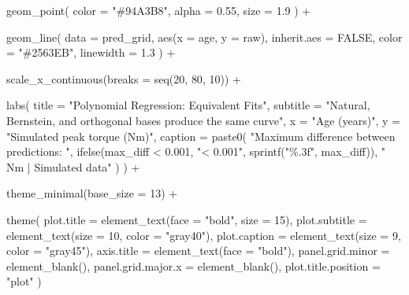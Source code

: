 \documentclass[
  letterpaper,
  DIV=11,
  numbers=noendperiod]{scrreprt}
\newenvironment{Shaded}{\begin{snugshade}}{\end{snugshade}}
\newcommand{\AttributeTok}[1]{\textcolor[rgb]{0.40,0.45,0.13}{#1}}
\newcommand{\ConstantTok}[1]{\textcolor[rgb]{0.56,0.35,0.01}{#1}}
\newcommand{\DecValTok}[1]{\textcolor[rgb]{0.68,0.00,0.00}{#1}}
\newcommand{\FloatTok}[1]{\textcolor[rgb]{0.68,0.00,0.00}{#1}}
\newcommand{\FunctionTok}[1]{\textcolor[rgb]{0.28,0.35,0.67}{#1}}
\newcommand{\NormalTok}[1]{\textcolor[rgb]{0.00,0.23,0.31}{#1}}
\newcommand{\SpecialCharTok}[1]{\textcolor[rgb]{0.37,0.37,0.37}{#1}}
\newcommand{\StringTok}[1]{\textcolor[rgb]{0.13,0.47,0.30}{#1}}
\begin{document}
\begin{Shaded}
\begin{Highlighting}[]
  \FunctionTok{geom\_point}\NormalTok{(}
    \AttributeTok{color =} \StringTok{"\#94A3B8"}\NormalTok{,}
    \AttributeTok{alpha =} \FloatTok{0.55}\NormalTok{,}
    \AttributeTok{size =} \FloatTok{1.9}
\NormalTok{  ) }\SpecialCharTok{+}

  \FunctionTok{geom\_line}\NormalTok{(}
    \AttributeTok{data =}\NormalTok{ pred\_grid,}
    \FunctionTok{aes}\NormalTok{(}\AttributeTok{x =}\NormalTok{ age, }\AttributeTok{y =}\NormalTok{ raw),}
    \AttributeTok{inherit.aes =} \ConstantTok{FALSE}\NormalTok{,}
    \AttributeTok{color =} \StringTok{"\#2563EB"}\NormalTok{,}
    \AttributeTok{linewidth =} \FloatTok{1.3}
\NormalTok{  ) }\SpecialCharTok{+}

  \FunctionTok{scale\_x\_continuous}\NormalTok{(}\AttributeTok{breaks =} \FunctionTok{seq}\NormalTok{(}\DecValTok{20}\NormalTok{, }\DecValTok{80}\NormalTok{, }\DecValTok{10}\NormalTok{)) }\SpecialCharTok{+}

  \FunctionTok{labs}\NormalTok{(}
    \AttributeTok{title =} \StringTok{"Polynomial Regression: Equivalent Fits"}\NormalTok{,}
    \AttributeTok{subtitle =} \StringTok{"Natural, Bernstein, and orthogonal bases produce the same curve"}\NormalTok{,}
    \AttributeTok{x =} \StringTok{"Age (years)"}\NormalTok{,}
    \AttributeTok{y =} \StringTok{"Simulated peak torque (Nm)"}\NormalTok{,}
    \AttributeTok{caption =} \FunctionTok{paste0}\NormalTok{(}
      \StringTok{"Maximum difference between predictions: "}\NormalTok{,}
      \FunctionTok{ifelse}\NormalTok{(max\_diff }\SpecialCharTok{\textless{}} \FloatTok{0.001}\NormalTok{, }\StringTok{"\textless{} 0.001"}\NormalTok{,}
             \FunctionTok{sprintf}\NormalTok{(}\StringTok{"\%.3f"}\NormalTok{, max\_diff)),}
      \StringTok{" Nm | Simulated data"}
\NormalTok{    )}
\NormalTok{  ) }\SpecialCharTok{+}

  \FunctionTok{theme\_minimal}\NormalTok{(}\AttributeTok{base\_size =} \DecValTok{13}\NormalTok{) }\SpecialCharTok{+}

  \FunctionTok{theme}\NormalTok{(}
    \AttributeTok{plot.title =} \FunctionTok{element\_text}\NormalTok{(}\AttributeTok{face =} \StringTok{"bold"}\NormalTok{, }\AttributeTok{size =} \DecValTok{15}\NormalTok{),}
    \AttributeTok{plot.subtitle =} \FunctionTok{element\_text}\NormalTok{(}\AttributeTok{size =} \DecValTok{10}\NormalTok{, }\AttributeTok{color =} \StringTok{"gray40"}\NormalTok{),}
    \AttributeTok{plot.caption =} \FunctionTok{element\_text}\NormalTok{(}\AttributeTok{size =} \DecValTok{9}\NormalTok{, }\AttributeTok{color =} \StringTok{"gray45"}\NormalTok{),}
    \AttributeTok{axis.title =} \FunctionTok{element\_text}\NormalTok{(}\AttributeTok{face =} \StringTok{"bold"}\NormalTok{),}
    \AttributeTok{panel.grid.minor =} \FunctionTok{element\_blank}\NormalTok{(),}
    \AttributeTok{panel.grid.major.x =} \FunctionTok{element\_blank}\NormalTok{(),}
    \AttributeTok{plot.title.position =} \StringTok{"plot"}
\NormalTok{  )}
\end{Highlighting}
\end{Shaded}
\end{document}
